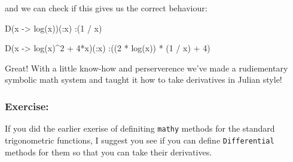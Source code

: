 \documentclass[11pt]{article}
\newenvironment{Shaded}{}{}
\newcommand{\FloatTok}[1]{\textcolor[rgb]{0.25,0.63,0.44}{{#1}}}
\newcommand{\NormalTok}[1]{{#1}}
\begin{document}
    and we can check if this gives us the correct behaviour:

\begin{Shaded}
\begin{Highlighting}[]
\NormalTok{D(x -> log(x))(:x)}
\NormalTok{:(}\FloatTok{1}\NormalTok{ / x)}

\NormalTok{D(x -> log(x)^}\FloatTok{2}\NormalTok{ + }\FloatTok{4}\NormalTok{*x)(:x)}
\NormalTok{:((}\FloatTok{2}\NormalTok{ * log(x)) * (}\FloatTok{1}\NormalTok{ / x) + }\FloatTok{4}\NormalTok{)}
\end{Highlighting}
\end{Shaded}

Great! With a little know-how and perserverence we've made a
rudiementary symbolic math system and taught it how to take derivatives
in Julian style!

    \hypertarget{exercise}{%
\subsubsection{Exercise:}\label{exercise}}

If you did the earlier exerise of definiting \texttt{mathy} methods for
the standard trigonometric functions, I suggest you see if you can
define \texttt{Differential} methods for them so that you can take their
derivatives.


    
    
    
    
\end{document}
